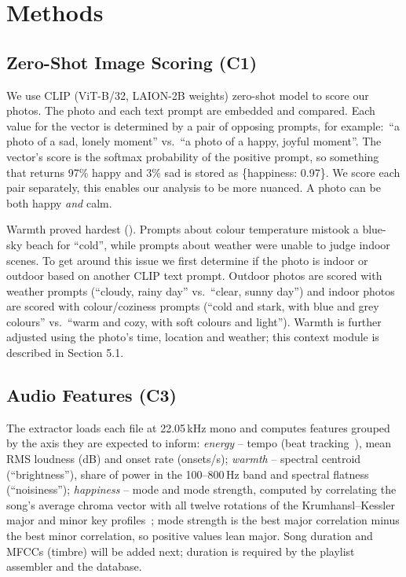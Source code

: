 \documentclass{article}
\begin{document}
\section{Methods}\label{sec:methods}

\subsection{Zero-Shot Image Scoring (C1)}\label{sec:clip}

We use CLIP (ViT-B/32, LAION-2B weights) zero-shot model to score our photos. 
The photo and each text prompt are embedded and compared. Each value for the vector
is determined by a pair of opposing prompts, for example:\ ``a photo of a sad, lonely
moment'' vs.\ ``a photo of a happy, joyful moment''. The vector's score is the
softmax probability of the positive prompt, so something that returns 97\% happy and 3\% sad 
is stored as \{happiness: 0.97\}. We score each pair separately, this enables our analysis to be more nuanced. A photo can be both
happy \emph{and} calm.

Warmth proved hardest (). Prompts about colour
temperature mistook a blue-sky beach for ``cold'', while prompts about weather
were unable to judge indoor scenes. To get around this issue we first determine 
if the photo is indoor or outdoor based on another CLIP text prompt. Outdoor photos are scored with weather
prompts (``cloudy, rainy day'' vs.\ ``clear, sunny day'') and indoor photos are scored with
colour/coziness prompts (``cold and stark, with blue and grey colours'' vs.\
``warm and cozy, with soft colours and light''). Warmth is further adjusted using the photo’s time, 
location and weather; this context module is described in Section 5.1.

\subsection{Audio Features (C3)}\label{sec:librosa}

The extractor loads each file at 22.05\,kHz mono and computes features grouped
by the axis they are expected to inform: \emph{energy} -- tempo (beat
tracking~\cite{ellis2007beat}), mean RMS loudness (dB) and onset rate (onsets/s);
\emph{warmth} -- spectral centroid (``brightness''), share of power in the
100--800\,Hz band and spectral flatness (``noisiness''); \emph{happiness} --
mode and mode strength, computed by correlating the song's average chroma
vector with all twelve rotations of the Krumhansl--Kessler major and minor key
profiles~\cite{krumhansl1990cognitive}; mode strength is the best major
correlation minus the best minor correlation, so positive values lean major.
Song duration and MFCCs (timbre) will be added next; duration is required by the
playlist assembler and the database.
\end{document}
